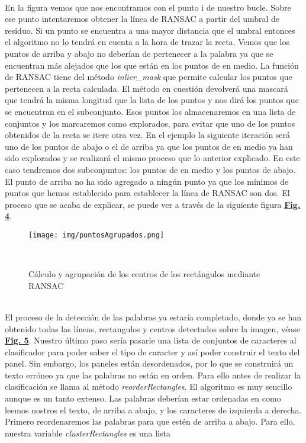 \documentclass[a4paper, 12pt]{article}
\begin{document}
\\ En la figura vemos que nos encontramos con el punto i de nuestro bucle. Sobre ese punto intentaremos obtener la línea de RANSAC a partir del umbral de residuo. Si un punto se encuentra a una mayor distancia que el umbral entonces el algoritmo no lo tendrá en cuenta a la hora de trazar la recta. Vemos que los puntos de arriba y abajo no deberían de pertenecer a la palabra ya que se encuentran más alejados que los que están en los puntos de en medio. La función de RANSAC tiene del método \textit{inlier\_mask} que permite calcular los puntos que pertenecen a la recta calculada. El método en cuestión devolverá una mascará que tendrá la misma longitud que la lista de los puntos y nos dirá  los puntos que se encuentran en el subconjunto. Esos puntos los almacenaremos en una lista de conjuntos y los marcaremos como explorados, para evitar que uno de los puntos obtenidos de la recta se itere otra vez. En el ejemplo la siguiente iteración será uno de los puntos de abajo o el de arriba ya que los puntos de en medio ya han sido explorados y se realizará el mismo proceso que lo anterior explicado. En este caso tendremos dos subconjuntos: los puntos de en medio y los puntos de abajo. El punto de arriba no ha sido agregado a ningún punto ya que los mínimos de puntos que hemos establecido para establecer la línea de RANSAC son dos. El proceso que se acaba de explicar, se puede ver a través de la siguiente figura \textbf{\hyperref[fig:puntosAgrupados]{Fig. 4}}.
\begin{figure}[h]
	\centering
	\texttt{[image: img/puntosAgrupados.png]}
 	\caption{Cálculo y agrupación de los centros de los rectángulos mediante RANSAC}\
	\label{fig:puntosAgrupados}
\end{figure}
\\El proceso de la detección de las palabras ya estaría completado, donde ya se han obtenido todas las líneas, rectangulos y centros detectados sobre la imagen, véase \textbf{\hyperref[fig:imagenDetectada]{Fig. 5}}. Nuestro último paso sería pasarle una lista de conjuntos de caracteres al clasificador para poder saber el tipo de caracter y así poder construir el texto del panel. Sin embargo, los paneles están desordenados, por lo que se construirá un texto erróneo ya que las palabras no están en orden. Para ello antes de realizar la clasificación se llama al método \textit{reorderRectangles}. El algoritmo es muy sencillo aunque es un tanto extenso. Las palabras deberían estar ordenadas en como leemos nostros el texto, de arriba a abajo, y los caracteres de izquierda a derecha. Primero reordenaremos las palabras para que estén de arriba a abajo. Para ello, nuestra variable \textit{clusterRectangles} es una lista 
\end{document}
